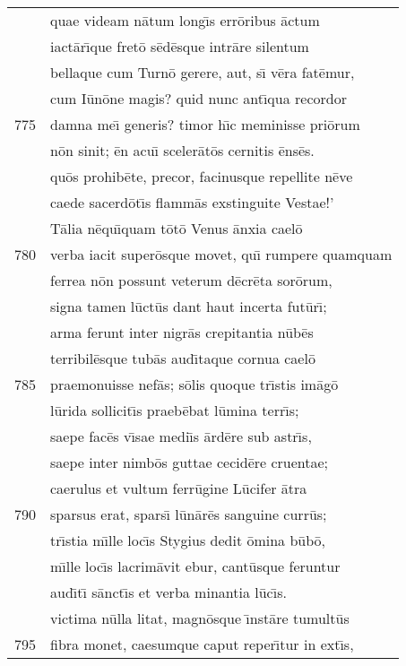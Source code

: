 \documentclass[paper=6in:9in,pagesize=pdftex,
               headinclude=on,footinclude=on,12pt]{scrbook}
\begin{document}
\begin{longtable}[p]{ r l }
 & quae videam n\=atum long\={\i}s err\=oribus \=actum\\ 
 & iact\=ar\={\i}que fret\=o s\=ed\=esque intr\=are silentum\\ 
 & bellaque cum Turn\=o gerere, aut, s\={\i} v\=era fat\=emur,\\ 
 & cum I\=un\=one magis? quid nunc ant\={\i}qua recordor\\ 
775 & damna me\={\i} generis? timor h\={\i}c meminisse pri\=orum\\ 
 & n\=on sinit; \=en acu\={\i} sceler\=at\=os cernitis \=ens\=es.\\ 
 & qu\=os prohib\=ete, precor, facinusque repellite n\=eve\\ 
 & caede sacerd\=ot\={\i}s flamm\=as exstinguite Vestae!'\\ 
 & \indent T\=alia n\=equ\={\i}quam t\=ot\=o Venus \=anxia cael\=o\\ 
780 & verba iacit super\=osque movet, qu\={\i} rumpere quamquam\\ 
 & ferrea n\=on possunt veterum d\=ecr\=eta sor\=orum,\\ 
 & signa tamen l\=uct\=us dant haut incerta fut\=ur\={\i};\\ 
 & arma ferunt inter nigr\=as crepitantia n\=ub\=es\\ 
 & terribil\=esque tub\=as aud\={\i}taque cornua cael\=o\\ 
785 & praemonuisse nef\=as; s\=olis quoque tr\={\i}stis im\=ag\=o\\ 
 & l\=urida sollicit\={\i}s praeb\=ebat l\=umina terr\={\i}s;\\ 
 & saepe fac\=es v\={\i}sae medi\={\i}s \=ard\=ere sub astr\={\i}s,\\ 
 & saepe inter nimb\=os guttae cecid\=ere cruentae;\\ 
 & caerulus et vultum ferr\=ugine L\=ucifer \=atra\\ 
790 & sparsus erat, spars\={\i} l\=un\=ar\=es sanguine curr\=us;\\ 
 & tr\={\i}stia m\={\i}lle loc\={\i}s Stygius dedit \=omina b\=ub\=o,\\ 
 & m\={\i}lle loc\={\i}s lacrim\=avit ebur, cant\=usque feruntur\\ 
 & aud\={\i}t\={\i} s\=anct\={\i}s et verba minantia l\=uc\={\i}s.\\ 
 & victima n\=ulla litat, magn\=osque \={\i}nst\=are tumult\=us\\ 
795 & fibra monet, caesumque caput reper\={\i}tur in ext\={\i}s,\\ 

\end{longtable}
\end{document}
